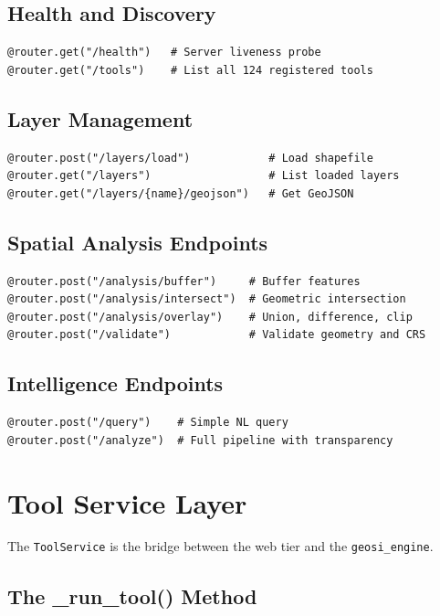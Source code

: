 \documentclass[12pt,a4paper]{report}
\begin{document}
\subsection{Health and Discovery}

\begin{lstlisting}
@router.get("/health")   # Server liveness probe
@router.get("/tools")    # List all 124 registered tools
\end{lstlisting}

\subsection{Layer Management}

\begin{lstlisting}
@router.post("/layers/load")            # Load shapefile
@router.get("/layers")                  # List loaded layers
@router.get("/layers/{name}/geojson")   # Get GeoJSON
\end{lstlisting}

\subsection{Spatial Analysis Endpoints}

\begin{lstlisting}
@router.post("/analysis/buffer")     # Buffer features
@router.post("/analysis/intersect")  # Geometric intersection
@router.post("/analysis/overlay")    # Union, difference, clip
@router.post("/validate")            # Validate geometry and CRS
\end{lstlisting}

\subsection{Intelligence Endpoints}

\begin{lstlisting}
@router.post("/query")    # Simple NL query
@router.post("/analyze")  # Full pipeline with transparency
\end{lstlisting}

\section{Tool Service Layer}

The \texttt{ToolService} is the bridge between the web tier and the \texttt{geosi\_engine}.

\subsection{The \_run\_tool() Method}
\end{document}

